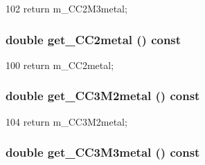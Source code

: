 \begin{DoxyCode}
102 { return m_CC2M3metal; }
\end{DoxyCode}
\hypertarget{classTechParameter_a3a3ddc4ac55983c4dde587e21ee96cd4}{
\subsubsection[{get\_\-CC2metal}]{\setlength{\rightskip}{0pt plus 5cm}double get\_\-CC2metal () const}}
\label{classTechParameter_a3a3ddc4ac55983c4dde587e21ee96cd4}



\begin{DoxyCode}
100 { return m_CC2metal; }
\end{DoxyCode}
\hypertarget{classTechParameter_acc7075f86c5c3d42dc26146459e92d6e}{
\subsubsection[{get\_\-CC3M2metal}]{\setlength{\rightskip}{0pt plus 5cm}double get\_\-CC3M2metal () const}}
\label{classTechParameter_acc7075f86c5c3d42dc26146459e92d6e}



\begin{DoxyCode}
104 { return m_CC3M2metal; }
\end{DoxyCode}
\hypertarget{classTechParameter_a472e5bc10baf89389967e0ecf5b2f16c}{
\subsubsection[{get\_\-CC3M3metal}]{\setlength{\rightskip}{0pt plus 5cm}double get\_\-CC3M3metal () const}}
\label{classTechParameter_a472e5bc10baf89389967e0ecf5b2f16c}



